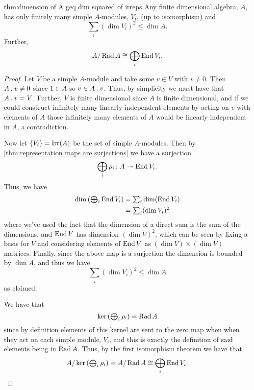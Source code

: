 \begin{thm}{}{thm:dimension of A geq dim squared of irreps}
    Any finite dimensional algebra, \(A\), has only finitely many simple \(A\)-modules, \(V_i\), (up to isomorphism) and
    \begin{equation}
        \sum_i (\dim V_i)^2 \le \dim A.
    \end{equation}
    Further,
    \begin{equation}
        A / \operatorname{Rad} A \cong \bigoplus_i \operatorname{End} V_i.
    \end{equation}
    \begin{proof}
        Let \(V\) be a simple \(A\)-module and take some \(v \in V\) with \(v \ne 0\).
        Then \(A \mathbin{.} v \ne 0\) since \(1 \in A\) so \(v \in A \mathbin{.} v\).
        Thus, by simplicity we must have that \(A \mathbin{.} v = V\).
        Further, \(V\) is finite dimensional since \(A\) is finite dimensional, and if we could construct infinitely many linearly independent elements by acting on \(v\) with elements of \(A\) those infinitely many elements of \(A\) would be linearly independent in \(A\), a contradiction.
        
        Now let \(\{V_i\} = \operatorname{Irr}(A)\) be the set of simple \(A\)-modules.
        Then by \cref{thm:representation maps are surjections} we have a surjection
        \begin{equation}
            \bigoplus_i \rho_i \colon A \twoheadrightarrow \operatorname{End} V_i.
        \end{equation}
        Thus, we have
        \begin{align}
            \dim \left( {\textstyle\bigoplus_{i}} \operatorname{End} V_i\right) &= {\textstyle\sum_i} \dim( \operatorname{End} V_i)\\
            &= {\textstyle\sum_i} (\dim V_i)^2
        \end{align}
        where we've used the fact that the dimension of a direct sum is the sum of the dimensions, and \(\operatorname{End} V\) has dimension \((\dim V)^2\), which can be seen by fixing a basis for \(V\) and considering elements of \(\operatorname{End} V\) as \((\dim V) \times (\dim V)\) matrices.
        Finally, since the above map is a surjection the dimension is bounded by \(\dim A\), and thus we have
        \begin{equation}
            \sum_i (\dim V_i)^2 \le \dim A
        \end{equation}
        as claimed.
        
        We have that
        \begin{equation}
            \ker\left( {\textstyle \bigoplus_i} \, \rho_i \right) = \operatorname{Rad} A
        \end{equation}
        since by definition elements of this kernel are sent to the zero map when when they act on each simple module, \(V_i\), and this is exactly the definition of said elements being in \(\operatorname{Rad} A\).
        Thus, by the first isomorphism theorem we have that
        \begin{equation*}
            A/\ker\left( {\textstyle \bigoplus_i} \, \rho_i \right) = A/\operatorname{Rad} A \cong \bigoplus_i \operatorname{End} V_i. \qedhere
        \end{equation*}
    \end{proof}
\end{thm}

